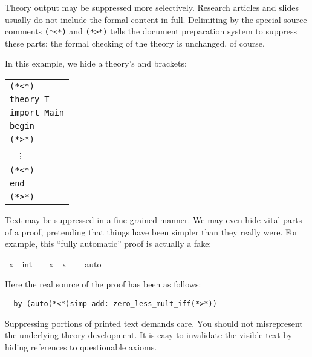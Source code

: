 \begin{isabellebody}
\begin{isamarkuptext}
  \medskip Theory output may be suppressed more selectively.  Research
  articles and slides usually do not include the formal content in
  full.  Delimiting  by the special source
  comments \verb,(,\verb,*,\verb,<,\verb,*,\verb,), and
  \verb,(,\verb,*,\verb,>,\verb,*,\verb,), tells the document
  preparation system to suppress these parts; the formal checking of
  the theory is unchanged, of course.

  In this example, we hide a theory's  and
   brackets:

  \medskip

  \begin{tabular}{l}
  \verb,(,\verb,*,\verb,<,\verb,*,\verb,), \\
  \texttt{theory T} \\
  \texttt{import Main} \\
  \texttt{begin} \\
  \verb,(,\verb,*,\verb,>,\verb,*,\verb,), \\
  ~~$\vdots$ \\
  \verb,(,\verb,*,\verb,<,\verb,*,\verb,), \\
  \texttt{end} \\
  \verb,(,\verb,*,\verb,>,\verb,*,\verb,), \\
  \end{tabular}

  \medskip

  Text may be suppressed in a fine-grained manner.  We may even hide
  vital parts of a proof, pretending that things have been simpler
  than they really were.  For example, this ``fully automatic'' proof
  is actually a fake:%
\end{isamarkuptext}%
\isamarkuptrue%
\ {\isachardoublequote}x\ {\isasymnoteq}\ {\isacharparenleft}{}{\isacharcolon}{\isacharcolon}int{\isacharparenright}\ {\isasymLongrightarrow}\ {}\ {\isacharless}\ x\ {\isacharasterisk}\ x{\isachardoublequote}\isanewline
\ \ \isamarkupfalse%
\ {\isacharparenleft}auto{\isacharparenright}\isamarkupfalse%
%
\begin{isamarkuptext}%
\noindent Here the real source of the proof has been as follows:

\begin{verbatim}
  by (auto(*<*)simp add: zero_less_mult_iff(*>*))
\end{verbatim}

  \medskip Suppressing portions of printed text demands care.  You
  should not misrepresent the underlying theory development.  It is
  easy to invalidate the visible text by hiding references to
  questionable axioms.


\end{isamarkuptext}
\end{isabellebody}

